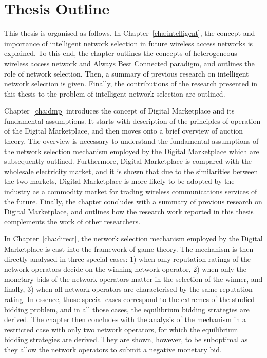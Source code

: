 \section{Thesis Outline} %
\label{sec:thesis_outline_introduction}
This thesis is organised as follows. In Chapter~\ref{cha:intelligent}, the concept and importance of intelligent network selection in future wireless access networks is explained. To this end, the chapter outlines the concepts of heterogeneous wireless access network and Always Best Connected paradigm, and outlines the role of network selection. Then, a summary of previous research on intelligent network selection is given. Finally, the contributions of the research presented in this thesis to the problem of intelligent network selection are outlined.

Chapter~\ref{cha:dmp} introduces the concept of Digital Marketplace and its fundamental assumptions. It starts with description of the principles of operation of the Digital Marketplace, and then moves onto a brief overview of auction theory. The overview is necessary to understand the fundamental assumptions of the network selection mechanism employed by the Digital Marketplace which are subsequently outlined. Furthermore, Digital Marketplace is compared with the wholesale electricity market, and it is shown that due to the similarities between the two markets, Digital Marketplace is more likely to be adopted by the industry as a commodity market for trading wireless communications services of the future. Finally, the chapter concludes with a summary of previous research on Digital Marketplace, and outlines how the research work reported in this thesis complements the work of other researchers.

In Chapter~\ref{cha:direct}, the network selection mechanism employed by the Digital Marketplace is cast into the framework of game theory. The mechanism is then directly analysed in three special cases: 1) when only reputation ratings of the network operators decide on the winning network operator, 2) when only the monetary bids of the network operators matter in the selection of the winner, and finally, 3) when all network operators are characterised by the same reputation rating. In essence, those special cases correspond to the extremes of the studied bidding problem, and in all those cases, the equilibrium bidding strategies are derived. The chapter then concludes with the analysis of the mechanism in a restricted case with only two network operators, for which the equilibrium bidding strategies are derived. They are shown, however, to be suboptimal as they allow the network operators to submit a negative monetary bid.

